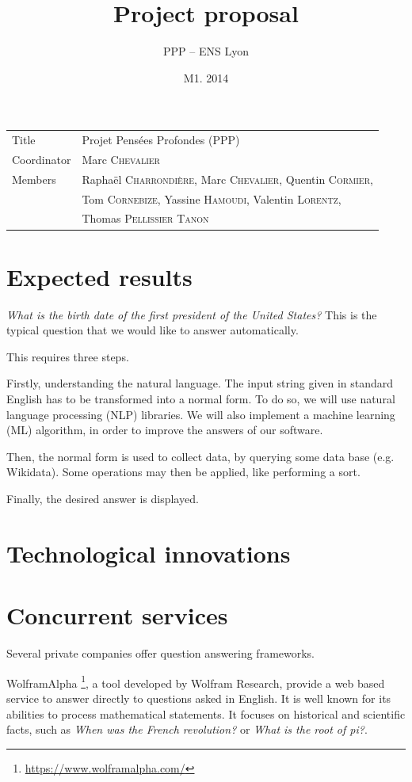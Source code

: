 \documentclass[a4paper,10pt]{article}
\title{Project proposal}
\author{PPP \--- ENS Lyon}
\date{M1. 2014}
\begin{document}
\maketitle

\begin{tabular}{|ll|}
\hline
Title & Projet Pensées Profondes (PPP)\\
Coordinator & Marc \textsc{Chevalier}\\
Members & Raphaël \textsc{Charrondière}, Marc \textsc{Chevalier}, Quentin \textsc{Cormier}, \\
        & Tom \textsc{Cornebize}, Yassine \textsc{Hamoudi}, Valentin \textsc{Lorentz},\\
        & Thomas \textsc{Pellissier} \textsc{Tanon}\\
\hline
\end{tabular}

\section{Expected results}
\emph{What is the birth date of the first president of the United States?} This is
the typical question that we would like to answer automatically.

This requires three steps. 

Firstly, understanding the natural language. The input string given in standard 
English has to be transformed into a normal form. To do so, we will use natural 
language processing (NLP) libraries. We will also implement a machine learning (ML)
algorithm, in order to improve the answers of our software.

Then, the normal form is used to collect data, by querying some data base (e.g.
Wikidata). Some operations may then be applied, like performing a sort.

Finally, the desired answer is displayed.


\section{Technological innovations}

\section{Concurrent services}

Several private companies offer question answering frameworks. 

WolframAlpha \footnote{\url{https://www.wolframalpha.com/}}, a tool developed by 
Wolfram Research, provide a web based service to answer directly to questions asked
in English. It is well known for its abilities to process mathematical statements.
It focuses on historical and scientific facts, such as \emph{When was the French 
revolution?} or \emph{What is the root of pi?}.
\end{document}

